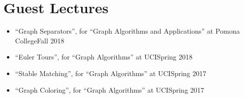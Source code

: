 \documentclass[letterpaper,10pt,oneside]{article}
\begin{document}
\section*{Guest Lectures}
\begin{itemize}
	\item ``Graph Separators'', for ``Graph Algorithms and Applications'' at Pomona College\hfill Fall 2018
	\item ``Euler Tours'', for ``Graph Algorithms'' at UCI\hfill Spring 2018
	\item ``Stable Matching'', for ``Graph Algorithms'' at UCI\hfill Spring 2017
	\item ``Graph Coloring'',  for ``Graph Algorithms'' at UCI\hfill Spring 2017
\end{itemize}
\end{document}
